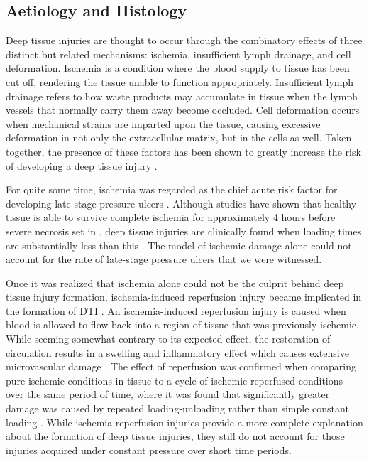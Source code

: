		\subsection{Aetiology and Histology}
			\label{sec:litreview-aetiology}
			Deep tissue injuries are thought to occur through the combinatory effects of three distinct but related mechanisms: ischemia, insufficient lymph drainage, and cell deformation. Ischemia is a condition where the blood supply to tissue has been cut off, rendering the tissue unable to function appropriately. Insufficient lymph drainage refers to how waste products may accumulate in tissue when the lymph vessels that normally carry them away become occluded. Cell deformation occurs when mechanical strains are imparted upon the tissue, causing excessive deformation in not only the extracellular matrix, but in the cells as well. Taken together, the presence of these factors has been shown to greatly increase the risk of developing a deep tissue injury \cite{stekelenburg08}.

			For quite some time, ischemia was regarded as the chief acute risk factor for developing late-stage pressure ulcers \cite{witkowski82,dinsdale74,kosiak61}. Although studies have shown that healthy tissue is able to survive complete ischemia for approximately 4 hours before severe necrosis set in \cite{labbe87,strock69}, deep tissue injuries are clinically found when loading times are substantially less than this \cite{aronovitch99,bliss99}. The model of ischemic damage alone could not account for the rate of late-stage pressure ulcers that we were witnessed.

			Once it was realized that ischemia alone could not be the culprit behind deep tissue injury formation, ischemia-induced reperfusion injury became implicated in the formation of DTI \cite{Ytrehus95,Blaisdell02,tsuji05}. An ischemia-induced reperfusion injury is caused when blood is allowed to flow back into a region of tissue that was previously ischemic. While seeming somewhat contrary to its expected effect, the restoration of circulation results in a swelling and inflammatory effect which causes extensive microvascular damage \cite{Blaisdell02}. The effect of reperfusion was confirmed when comparing pure ischemic conditions in tissue to a cycle of ischemic-reperfused conditions over the same period of time, where it was found that significantly greater damage was caused by repeated loading-unloading rather than simple constant loading \cite{tsuji05,salcido94}. While ischemia-reperfusion injuries provide a more complete explanation about the formation of deep tissue injuries, they still do not account for those injuries acquired under constant pressure over short time periods.


